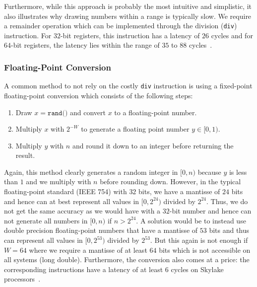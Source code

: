 \documentclass[a4paper, UKenglish, cleveref, autoref, thm-restate]{lipics-v2021}
\begin{document}
Furthermore, while this approach is probably the most intuitive and simplistic, it also illustrates why drawing numbers within a range is typically slow.
We require a remainder operation which can be implemented through the division (\texttt{div}) instruction.
For $32$-bit registers, this instruction has a latency of $26$ cycles and for $64$-bit registers, the latency lies within the range of $35$ to $88$ cycles~\cite{Instructions}.


\subsubsection{Floating-Point Conversion}\label{sec:2.1.2}
A common method to not rely on the costly \texttt{div} instruction is using a fixed-point floating-point conversion which consists of the following steps:
\begin{enumerate}
    \item Draw $x = \texttt{rand()}$ and convert $x$ to a floating-point number.
    \item Multiply $x$ with $2^{-W}$ to generate a floating point number $y \in [0,1)$.
    \item Multiply $y$ with $n$ and round it down to an integer before returning the result.
\end{enumerate}

Again, this method clearly generates a random integer in $[0,n)$ because $y$ is less than $1$ and we multiply with $n$ before rounding down.
However, in the typical floating-point standard (IEEE 754) with $32$ bits, we have a mantisse of $24$ bits and hence can at best represent all values in $[0,2^{24})$ divided by $2^{24}$.
Thus, we do not get the same accuracy as we would have with a $32$-bit number and hence can not generate all numbers in $[0,n)$ if $n > 2^{24}$.
A solution would be to instead use double precision floating-point numbers that have a mantisse of $53$ bits and thus can represent all values in $[0,2^{53})$ divided by $2^{53}$.
But this again is not enough if $W = 64$ where we require a mantisse of at least $64$ bits which is not accessible on all systems (long double).
Furthermore, the conversion also comes at a price: the corresponding instructions have a latency of at least $6$ cycles on Skylake processors~\cite{Instructions}.
\end{document}
